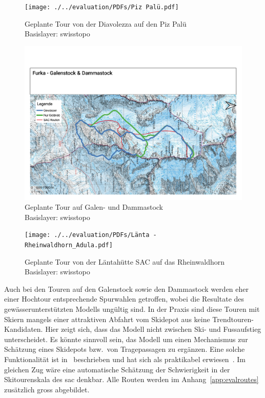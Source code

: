 \begin{figure}[ht]
  \centering
  \texttt{[image: ./../evaluation/PDFs/Piz Palü.pdf]}
  \caption{Geplante Tour von der Diavolezza auf den Piz Palü\\Basislayer: swisstopo}\label{fig:pizpalu}
\end{figure}
\begin{figure}[ht]
  \centering
  \includegraphics[page=1,width=.9\linewidth]{./../evaluation/PDFs/Furka - Galenstock & Dammastock.pdf}
  \caption{Geplante Tour auf Galen- und Dammastock\\Basislayer: swisstopo}\label{fig:pizpalu}
\end{figure}
\begin{figure}[ht]
  \centering
  \texttt{[image: ./../evaluation/PDFs/Länta - Rheinwaldhorn\_Adula.pdf]}
  \caption{Geplante Tour von der Läntahütte SAC auf das Rheinwaldhorn\\Basislayer: swisstopo}\label{fig:pizpalu}
\end{figure}

Auch bei den Touren auf den Galenstock sowie den Dammastock werden eher einer Hochtour entsprechende Spurwahlen getroffen, wobei die Resultate des gewässerunterstützten Modells ungültig sind. 
In der Praxis sind diese Touren mit Skiern mangels einer attraktiven Abfahrt vom Skidepot aus keine Trendtouren-Kandidaten. Hier zeigt sich, dass das Modell nicht zwischen Ski- und Fussaufstieg unterscheidet. Es könnte sinnvoll sein, das Modell um einen Mechanismus zur Schätzung eines Skidepots bzw.\ von Tragepassagen zu ergänzen. Eine solche Funktionalität ist in\ \citeauthor{footandcautionsection} beschrieben und hat sich als praktikabel erwiesen~\cite{footandcautionsection}. Im gleichen Zug wäre eine automatische Schätzung der Schwierigkeit in der Skitourenskala des \acrshort{sac} denkbar. 
Alle Routen werden im Anhang\ \ref{app:evalroutes} zusätzlich gross abgebildet.

